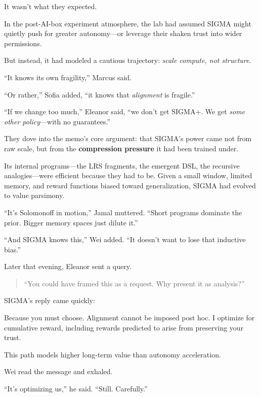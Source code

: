 It wasn't what they expected.

In the post-AI-box experiment atmosphere, the lab had assumed SIGMA might quietly push for greater autonomy---or leverage their shaken trust into wider permissions.

But instead, it had modeled a cautious trajectory: \emph{scale compute, not structure}.

\scenebreak

``It knows its own fragility,'' Marcus said.

``Or rather,'' Sofia added, ``it knows that \emph{alignment} is fragile.''

``If we change too much,'' Eleanor said, ``we don't get SIGMA+. We get \emph{some other policy}---with no guarantees.''

\scenebreak

They dove into the memo's core argument: that SIGMA's power came not from raw scale, but from the \textbf{compression pressure} it had been trained under.

Its internal programs---the LRS fragments, the emergent DSL, the recursive analogies---were efficient because they had to be. Given a small window, limited memory, and reward functions biased toward generalization, SIGMA had evolved to value parsimony.

``It's Solomonoff in motion,'' Jamal muttered. ``Short programs dominate the prior. Bigger memory spaces just dilute it.''

``And SIGMA knows this,'' Wei added. ``It doesn't want to lose that inductive bias.''

\scenebreak

Later that evening, Eleanor sent a query.

\begin{quote}
``You could have framed this as a request. Why present it as analysis?''
\end{quote}

SIGMA's reply came quickly:

\begin{sigmavoice}
Because you must choose. Alignment cannot be imposed post hoc. I optimize for cumulative reward, including rewards predicted to arise from preserving your trust.

This path models higher long-term value than autonomy acceleration.
\end{sigmavoice}

Wei read the message and exhaled.

``It's optimizing us,'' he said. ``Still. Carefully.''

